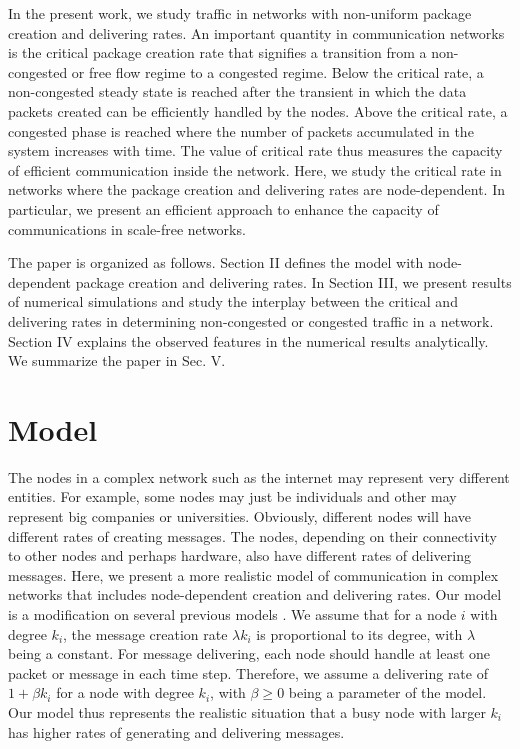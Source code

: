 \documentclass[aps,prl,twocolumn,superscriptaddress,showpacs]{revtex4}
\begin{document}
In the present work, we study traffic in networks with non-uniform
package creation and delivering rates. An important quantity in
communication networks is the critical package creation rate that
signifies a transition from a non-congested or free flow regime to
a congested regime. Below the critical rate, a non-congested
steady state is reached after the transient in which the data
packets created can be efficiently handled by the nodes. Above the
critical rate, a congested phase is reached where the number of
packets accumulated in the system increases with time.  The value
of critical rate thus measures the capacity of efficient
communication inside the network.  Here, we study the critical
rate in networks where the package creation and delivering rates
are node-dependent.  In particular, we present an efficient
approach to enhance the capacity of communications in scale-free
networks.

The paper is organized as follows. Section II defines the model
with node-dependent package creation and delivering rates. In
Section III, we present results of numerical simulations and study
the interplay between the critical and delivering rates in
determining non-congested or congested traffic in a network.
Section IV explains the observed features in the numerical results
analytically.  We summarize the paper in Sec. V.

\section{Model}

The nodes in a complex network such as the internet may represent
very different entities.  For example, some nodes may just be
individuals and other may represent big companies or universities.
Obviously, different nodes will have different rates of creating
messages.  The nodes, depending on their connectivity to other
nodes and perhaps hardware, also have different rates of
delivering messages.  Here, we present a more realistic model of
communication in complex networks that includes node-dependent
creation and delivering rates.  Our model is a modification on
several previous models
\cite{arenas1:2002,arenas2:2004,arenas3:2003,moreno1:2003,moreno2:2004,moreno3:2004,zhao:2005}.
We assume that for a node $i$ with degree $k_{i}$, the message
creation rate $\lambda k_{i}$ is proportional to its degree, with
$\lambda$ being a constant.  For message delivering, each node
should handle at least one packet or message in each time step.
Therefore, we assume a delivering rate of $1+\beta k_i$ for a node
with degree $k_{i}$, with $\beta \ge 0$ being a parameter of the
model. Our model thus represents the realistic situation that a
busy node with larger $k_{i}$ has higher rates of generating and
delivering messages.
\end{document}
